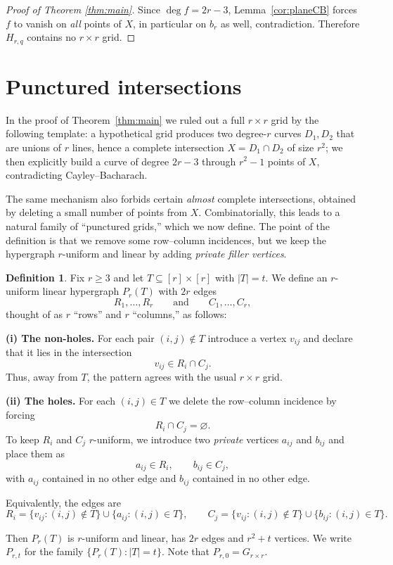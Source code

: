 \documentclass[11pt]{article}
\theoremstyle{definition}
\newtheorem{definition}[theorem]{Definition}
\theoremstyle{remark}
\begin{document}
\begin{proof}[Proof of Theorem \ref{thm:main}]
Since $\deg f = 2r-3$, Lemma~\ref{cor:planeCB} forces $f$ to vanish on \emph{all} points of $X$,
in particular on $b_r$ as well, contradiction. Therefore $H_{r,q}$ contains no $r\times r$ grid.
\end{proof}

\section{Punctured intersections}\label{sec:punctured}

In the proof of Theorem~\ref{thm:main} we ruled out a full $r\times r$ grid by the following template:
a hypothetical grid produces two degree-$r$ curves $D_1,D_2$ that are unions of $r$ lines, hence
a complete intersection $X=D_1\cap D_2$ of size $r^2$; we then explicitly build a curve of degree $2r-3$
through $r^2-1$ points of $X$, contradicting Cayley--Bacharach.

The same mechanism also forbids certain \emph{almost} complete intersections, obtained by deleting a small number of points from $X$.
Combinatorially, this leads to a natural family of ``punctured grids,'' which we now define.
The point of the definition is that we remove some row--column incidences, but we keep the hypergraph $r$-uniform and linear by
adding \emph{private filler vertices}.

\medskip

\begin{definition}\label{def:Prt}
Fix $r\ge 3$ and let $T\subseteq [r]\times[r]$ with $|T|=t$.
We define an $r$-uniform linear hypergraph $P_r(T)$ with $2r$ edges
\[
R_1,\dots,R_r \qquad\text{and}\qquad C_1,\dots,C_r,
\]
thought of as $r$ ``rows'' and $r$ ``columns,'' as follows:

\smallskip

\noindent\textbf{(i) The non-holes.}
For each pair $(i,j)\notin T$ introduce a vertex $v_{ij}$ and declare that it lies in the intersection
\[
v_{ij}\in R_i\cap C_j.
\]
Thus, away from $T$, the pattern agrees with the usual $r\times r$ grid.

\smallskip

\noindent\textbf{(ii) The holes.}
For each $(i,j)\in T$ we delete the row--column incidence by forcing
\[
R_i\cap C_j=\varnothing.
\]
To keep $R_i$ and $C_j$ $r$-uniform, we introduce two \emph{private} vertices $a_{ij}$ and $b_{ij}$ and place them as
\[
a_{ij}\in R_i,\qquad b_{ij}\in C_j,
\]
with $a_{ij}$ contained in no other edge and $b_{ij}$ contained in no other edge.

\smallskip

Equivalently, the edges are
\[
R_i=\{v_{ij}:(i,j)\notin T\}\cup\{a_{ij}:(i,j)\in T\},\qquad
C_j=\{v_{ij}:(i,j)\notin T\}\cup\{b_{ij}:(i,j)\in T\}.
\]

\smallskip

Then $P_r(T)$ is $r$-uniform and linear, has $2r$ edges and $r^2+t$ vertices.
We write $P_{r,t}$ for the family $\{P_r(T): |T|=t\}$.
Note that $P_{r,0}=G_{r\times r}$.
\end{definition}
\end{document}
